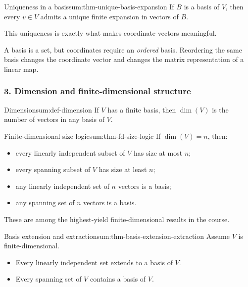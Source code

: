 \begin{theorem}{Uniqueness in a basis}{sum:thm-unique-basis-expansion}
If \(B\) is a basis of \(V\), then every \(v\in V\) admits a unique finite expansion in vectors of \(B\).
\end{theorem}

This uniqueness is exactly what makes coordinate vectors meaningful.

\begin{commonmistake}[title={Common Mistake: forgetting that order matters}]
A basis is a set, but coordinates require an \emph{ordered} basis. Reordering the same basis changes the coordinate vector and changes the matrix representation of a linear map.
\end{commonmistake}

\subsubsection*{3. Dimension and finite-dimensional structure}

\begin{definition}{Dimension}{sum:def-dimension}
If \(V\) has a finite basis, then \(\dim(V)\) is the number of vectors in any basis of \(V\).
\end{definition}

\begin{theorem}{Finite-dimensional size logic}{sum:thm-fd-size-logic}
If \(\dim(V)=n\), then:
\begin{itemize}[leftmargin=*]
    \item every linearly independent subset of \(V\) has size at most \(n\);
    \item every spanning subset of \(V\) has size at least \(n\);
    \item any linearly independent set of \(n\) vectors is a basis;
    \item any spanning set of \(n\) vectors is a basis.
\end{itemize}
\end{theorem}

These are among the highest-yield finite-dimensional results in the course.

\begin{theorem}{Basis extension and extraction}{sum:thm-basis-extension-extraction}
Assume \(V\) is finite-dimensional.
\begin{itemize}[leftmargin=*]
    \item Every linearly independent set extends to a basis of \(V\).
    \item Every spanning set of \(V\) contains a basis of \(V\).
\end{itemize}
\end{theorem}

